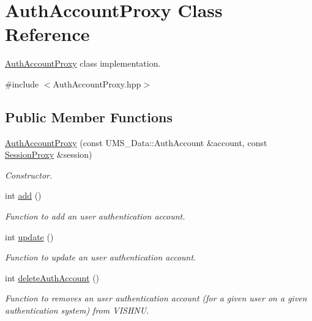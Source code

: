 \hypertarget{classAuthAccountProxy}{
\section{AuthAccountProxy Class Reference}
\label{classAuthAccountProxy}
}


\hyperlink{classAuthAccountProxy}{AuthAccountProxy} class implementation.  




{\ttfamily \#include $<$AuthAccountProxy.hpp$>$}

\subsection*{Public Member Functions}
\begin{DoxyCompactItemize}
\item 
\hyperlink{classAuthAccountProxy_a7a2ef7680326869d922ac95f0a79b73f}{AuthAccountProxy} (const UMS\_\-Data::AuthAccount \&account, const \hyperlink{classSessionProxy}{SessionProxy} \&session)
\begin{DoxyCompactList}\small\item\em Constructor. \item\end{DoxyCompactList}\item 
int \hyperlink{classAuthAccountProxy_ac76c8bf2a8ae166f17059ba2a21d11f8}{add} ()
\begin{DoxyCompactList}\small\item\em Function to add an user authentication account. \item\end{DoxyCompactList}\item 
int \hyperlink{classAuthAccountProxy_a0180343cdf4652fc8690184f0843f818}{update} ()
\begin{DoxyCompactList}\small\item\em Function to update an user authentication account. \item\end{DoxyCompactList}\item 
int \hyperlink{classAuthAccountProxy_a1ca9b4f3b6ca295b7608d8ec096a9476}{deleteAuthAccount} ()
\begin{DoxyCompactList}\small\item\em Function to removes an user authentication account (for a given user on a given authentication system) from VISHNU. \item\end{DoxyCompactList}\item 

\end{DoxyCompactItemize}
